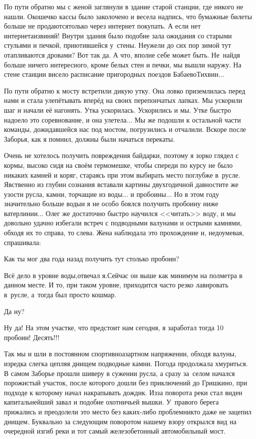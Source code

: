 По пути обратно мы с женой заглянули в здание старой станции, где никого не нашли. Окошечко кассы было заколочено и весела надпись, что бумажные билеты больше не продаются\mdash только через интернет покупать. А если нет интернета\mdash извиняй! Внутри здания было подобие зала ожидания со старыми стульями и печкой, приютившейся у~стены. Неужели до сих пор зимой тут отапливаются дровами? Вот так да. А что, вполне себе может быть. Не~найдя больше ничего интересного, кроме белых стен и печки, мы вышли наружу. На стене станции висело расписание пригородных поездов Бабаево\sdash Тихвин$\ldots$ 

По пути обратно к мосту встретили дикую утку. Она ловко приземлилась перед нами и стала улепётывать вперёд на своих перепончатых лапках. Мы ускорили шаг и начали её нагонять. Утка ускорилась. Ускорились и мы. Утке быстро надоело это соревнование, и она улетела$\ldots$ Мы же подошли к остальной части команды, дожидавшейся нас под мостом, погрузились и отчалили. Вскоре после Заборья, как я помнил, должны были начаться перекаты.

Очень не хотелось получить повреждения байдарки, поэтому я зорко глядел с кормы, высоко сидя на своём гермомешке, чтобы спереди по курсу не было никаких камней и коряг, стараясь при этом выбирать место поглубже в~русле. Явственно из глубин сознания вставали картины двухгодичной давности\mdash те же узости русла, камни, торчащие из воды$\ldots$ и пробоины$\ldots$ Но в этом году значительно больше воды\mdash и я не особо боялся получить пробоину ниже ватерлинии$\ldots$ Олег же достаточно быстро научился <<читать>> воду, и мы довольно удачно избегали встреч с подводными валунами и острыми камнями, обходя их то справа, то слева. Жена наблюдала это прохождение и, недоумевая, спрашивала:

\diagdash Как ты мог два года назад получить тут столько пробоин? 

\diagdash Всё дело в уровне воды,\mdash отвечал я.\mdash Сейчас он выше как минимум на полметра в данном месте. И то, при таком уровне, приходится часто резко лавировать в~русле, а~тогда был просто кошмар.

\diagdash Да ну?

\diagdash Ну да! На этом участке, что предстоит нам сегодня, я заработал тогда 10 пробоин! Десять!!!

Так мы и шли в постоянном спортивно\sdash азартном напряжении, обходя валуны, изредка слегка цепляя днищем подводные камни. Погода продолжала хмуриться. В самом Заборье прошли шиверу в сужении русла, а сразу за~селом начался порожистый участок, после которого дошли без приключений до Гришкино, при подходе к которому начал накрапывать дождик. Из\sdash за поворота реки стал виден капитальнейший завал и подобие охотничьей вышки. У~правого берега прижались и преодолели это место без каких-либо проблем\mdash никто даже не зацепил днищем. Буквально за следующим поворотом нашему взору открылся вид на очередной изгиб реки и тот самый железобетонный автомобильный мост. 

